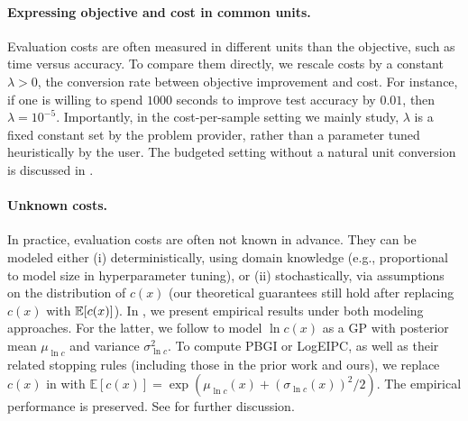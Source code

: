 \paragraph{Expressing objective and cost in common units.} Evaluation costs are often measured in different units than the objective, such as time versus accuracy.
To compare them directly, we rescale costs by a constant $\lambda > 0$, the conversion rate between objective improvement and cost.
For instance, if one is willing to spend $1000$ seconds to improve test accuracy by $0.01$, then $\lambda = 10^{-5}$.
Importantly, in the cost-per-sample setting we mainly study, $\lambda$ is a fixed constant set by the problem provider, rather than a parameter tuned heuristically by the user. The budgeted setting without a natural unit conversion is discussed in .



\paragraph{Unknown costs.}
In practice, evaluation costs are often not known in advance. They can be modeled either (i) deterministically, using domain knowledge (e.g., proportional to model size in hyperparameter tuning), or (ii) stochastically, via assumptions on the distribution of $c(x)$ (our theoretical guarantees still hold after replacing $c(x)$ with $\mathbb{E}[c(x)]$). In , we present empirical results under both modeling approaches. For the latter, we follow \citet[Proposition~2]{astudillo2021multi} to model $\ln c(x)$ as a GP with posterior mean $\mu_{\ln c}$ and variance $\sigma^2_{\ln c}$. To compute PBGI or LogEIPC, as well as their related stopping rules (including those in the prior work and ours), we replace $c(x)$ in  with $\mathbb{E}[c(x)]= \exp(\mu_{\ln c}(x)+(\sigma_{\ln c}(x))^2 / 2 )$. The empirical performance is preserved. See  for further discussion. 


